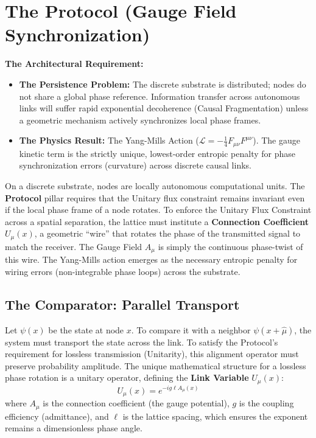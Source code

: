 \section{The Protocol (Gauge Field Synchronization)}
\label{sec:protocol}

\textbf{The Architectural Requirement:}
\begin{itemize}
    \item \textbf{The Persistence Problem:} The discrete substrate is distributed; nodes do not share a global phase reference. Information transfer across autonomous links will suffer rapid exponential decoherence (Causal Fragmentation) unless a geometric mechanism actively synchronizes local phase frames.
    \item \textbf{The Physics Result:} The Yang-Mills Action ($\mathcal{L} = -\frac{1}{4}F_{\mu\nu}F^{\mu\nu}$). The gauge kinetic term is the strictly unique, lowest-order entropic penalty for phase synchronization errors (curvature) across discrete causal links.
\end{itemize}

On a discrete substrate, nodes are locally autonomous computational units. The \textbf{Protocol} pillar requires that the Unitary flux constraint remains invariant even if the local phase frame of a node rotates. To enforce the Unitary Flux Constraint across a spatial separation, the lattice must institute a \textbf{Connection Coefficient} $U_\mu(x)$, a geometric ``wire'' that rotates the phase of the transmitted signal to match the receiver. The Gauge Field $A_\mu$ is simply the continuous phase-twist of this wire. The Yang-Mills action emerges as the necessary entropic penalty for wiring errors (non-integrable phase loops) across the substrate.

\subsection{The Comparator: Parallel Transport}

Let $\psi(x)$ be the state at node $x$. To compare it with a neighbor $\psi(x+\hat{\mu})$, the system must transport the state across the link. To satisfy the Protocol's requirement for lossless transmission (Unitarity), this alignment operator must preserve probability amplitude. The unique mathematical structure for a lossless phase rotation is a unitary operator, defining the \textbf{Link Variable} $U_\mu(x)$:
\begin{equation}
    U_\mu(x) = e^{-ig \ell A_\mu(x)}
\end{equation}
where $A_\mu$ is the connection coefficient (the gauge potential), $g$ is the coupling efficiency (admittance), and $\ell$ is the lattice spacing, which ensures the exponent remains a dimensionless phase angle.

